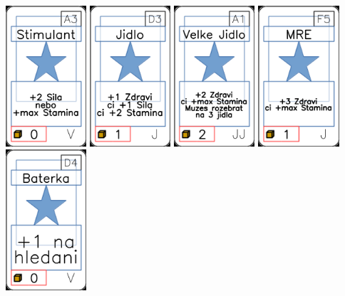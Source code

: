 \documentclass[a4paper]{article}
\begin{document}
	\includegraphics[width=3.0cm]{img-1_62}
	\includegraphics[width=3.0cm]{img-1_17}
	\includegraphics[width=3.0cm]{img-1_30}
	\includegraphics[width=3.0cm]{img-1_29}
	\includegraphics[width=3.0cm]{img-1_78}
\end{document}
